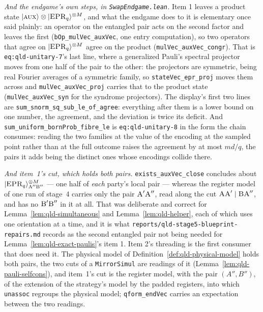 \emph{And the endgame's own steps, in \texttt{SwapEndgame.lean}.} Item 1 leaves a product state
$|\textsc{aux}\rangle \otimes |\textsc{EPR}_q\rangle^{\otimes M}$, and what the endgame does to it is elementary once said
plainly: an operator on the entangled pair acts on the second factor and leaves the first
(\texttt{bOp\_mulVec\_auxVec}, one entry computation), so two operators that agree on
$|\textsc{EPR}_q\rangle^{\otimes M}$ agree on the product (\texttt{mulVec\_auxVec\_congr}). That is
\texttt{eq:qld-unitary-7}'s last line, where a generalized Pauli's spectral projector moves from
one half of the pair to the other: the projectors are symmetric, being real Fourier averages of a
symmetric family, so \texttt{stateVec\_epr\_proj} moves them across and
\texttt{mulVec\_auxVec\_proj} carries that to the product state
(\texttt{mulVec\_auxVec\_syn} for the syndrome projectors). The display's first two lines are
\texttt{sum\_snorm\_sq\_sub\_le\_of\_agree}: everything after them is a lower bound on one
number, the agreement, and the deviation is twice its deficit. And
\texttt{sum\_uniform\_bornProb\_fibre\_le} is \texttt{eq:qld-unitary-8} in the form the chain
consumes: reading the two families at the value of the encoding at the sampled point rather than at
the full outcome raises the agreement by at most $md/q$, the pairs it adds being the distinct ones
whose encodings collide there.

\emph{And item~1's cut, which holds both pairs.} \texttt{exists\_auxVec\_close} concludes about
$|\textsc{EPR}_q\rangle^{\otimes M}_{\textsc{A}'' \textsc{B}''}$ --- one half of \emph{each} party's local pair --- whereas
the register model of one run of stage~4 carries only the pair $\textsc{A}' \textsc{A}''$, read along the
cut $\textsc{A} \textsc{A}' \mid \textsc{B} \textsc{A}''$, and has no $\textsc{B}' \textsc{B}''$ in it at all. That was
deliberate and correct for Lemma~\ref{lem:qld-simultaneous} and Lemma~\ref{lem:qld-helper}, each
of which uses one orientation at a time, and it is what
\texttt{reports/qld-stage5-blueprint-repairs.md} records as the second entangled pair not being
needed for Lemma~\ref{lem:qld-exact-paulis}'s item 1. Item 2's threading is the first consumer
that does need it. The physical model of Definition~\ref{def:qld-physical-model} holds both pairs,
the two cuts of a \texttt{MirrorSimul} are readings of it (Lemma~\ref{lem:qld-pauli-selfcons}), and
item~1's cut is the register model, with the pair $(A'', B'')$, of the extension of the strategy's
model by the padded registers, into which \texttt{unassoc} regroups the physical model;
\texttt{qform\_endVec} carries an expectation between the two readings.


